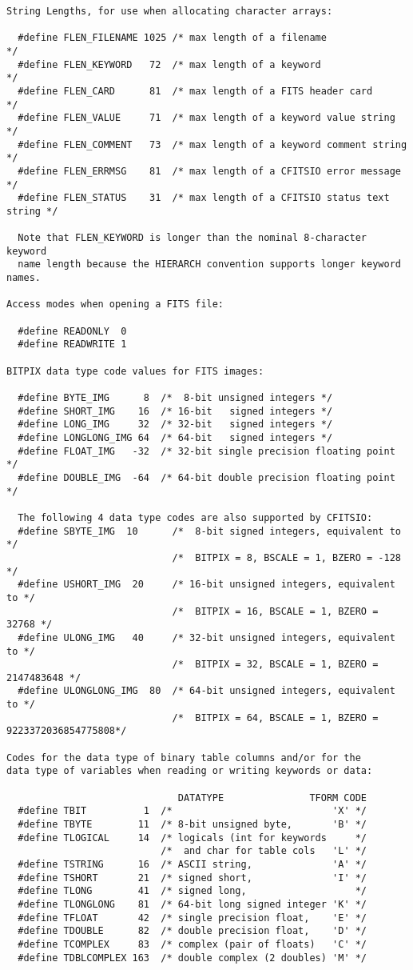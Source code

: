 \documentclass[11pt]{book}
\begin{document}
\begin{verbatim}
String Lengths, for use when allocating character arrays:

  #define FLEN_FILENAME 1025 /* max length of a filename                  */
  #define FLEN_KEYWORD   72  /* max length of a keyword                   */
  #define FLEN_CARD      81  /* max length of a FITS header card          */
  #define FLEN_VALUE     71  /* max length of a keyword value string      */
  #define FLEN_COMMENT   73  /* max length of a keyword comment string    */
  #define FLEN_ERRMSG    81  /* max length of a CFITSIO error message     */
  #define FLEN_STATUS    31  /* max length of a CFITSIO status text string */

  Note that FLEN_KEYWORD is longer than the nominal 8-character keyword
  name length because the HIERARCH convention supports longer keyword names.

Access modes when opening a FITS file:

  #define READONLY  0
  #define READWRITE 1

BITPIX data type code values for FITS images:

  #define BYTE_IMG      8  /*  8-bit unsigned integers */
  #define SHORT_IMG    16  /* 16-bit   signed integers */
  #define LONG_IMG     32  /* 32-bit   signed integers */
  #define LONGLONG_IMG 64  /* 64-bit   signed integers */
  #define FLOAT_IMG   -32  /* 32-bit single precision floating point */
  #define DOUBLE_IMG  -64  /* 64-bit double precision floating point */

  The following 4 data type codes are also supported by CFITSIO:
  #define SBYTE_IMG  10      /*  8-bit signed integers, equivalent to */
                             /*  BITPIX = 8, BSCALE = 1, BZERO = -128 */
  #define USHORT_IMG  20     /* 16-bit unsigned integers, equivalent to */
                             /*  BITPIX = 16, BSCALE = 1, BZERO = 32768 */
  #define ULONG_IMG   40     /* 32-bit unsigned integers, equivalent to */
                             /*  BITPIX = 32, BSCALE = 1, BZERO = 2147483648 */
  #define ULONGLONG_IMG  80  /* 64-bit unsigned integers, equivalent to */
                             /*  BITPIX = 64, BSCALE = 1, BZERO = 9223372036854775808*/

Codes for the data type of binary table columns and/or for the
data type of variables when reading or writing keywords or data:

                              DATATYPE               TFORM CODE
  #define TBIT          1  /*                            'X' */
  #define TBYTE        11  /* 8-bit unsigned byte,       'B' */
  #define TLOGICAL     14  /* logicals (int for keywords     */
                           /*  and char for table cols   'L' */
  #define TSTRING      16  /* ASCII string,              'A' */
  #define TSHORT       21  /* signed short,              'I' */
  #define TLONG        41  /* signed long,                   */
  #define TLONGLONG    81  /* 64-bit long signed integer 'K' */
  #define TFLOAT       42  /* single precision float,    'E' */
  #define TDOUBLE      82  /* double precision float,    'D' */
  #define TCOMPLEX     83  /* complex (pair of floats)   'C' */
  #define TDBLCOMPLEX 163  /* double complex (2 doubles) 'M' */


\end{verbatim}
\end{document}
